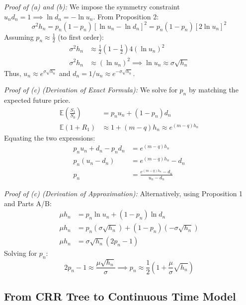 \textit{Proof of (a) and (b):}
We impose the symmetry constraint \(u_n d_n = 1 \implies \ln d_n = - \ln u_n\).
From Proposition 2:
\begin{equation*}
    \sigma^2 h_n = p_n(1-p_n)[\ln u_n - \ln d_n]^2 = p_n(1-p_n)[2 \ln u_n]^2
\end{equation*}
Assuming \(p_n \approx \frac{1}{2}\) (to first order):
\begin{align*}
    \sigma^2 h_n &\approx \frac{1}{2}\left(1-\frac{1}{2}\right) 4 (\ln u_n)^2 \\
    \sigma^2 h_n &\approx (\ln u_n)^2 \implies \ln u_n \approx \sigma\sqrt{h_n}
\end{align*}
Thus, \(u_n \approx e^{\sigma\sqrt{h_n}}\) and \(d_n = 1/u_n \approx e^{-\sigma\sqrt{h_n}}\).

\textit{Proof of (c) (Derivation of Exact Formula):}
We solve for \(p_n\) by matching the expected future price.
\begin{align*}
    \mathbb{E}\left(\frac{S_1}{S_0}\right) &= p_n u_n + (1-p_n)d_n \\
    \mathbb{E}(1+R_1) &\approx 1 + (m-q)h_n \approx e^{(m-q)h_n}
\end{align*}
Equating the two expressions:
\begin{align*}
    p_n u_n + d_n - p_n d_n &= e^{(m-q)h_n} \\
    p_n(u_n - d_n) &= e^{(m-q)h_n} - d_n \\
    p_n &= \frac{e^{(m-q)h_n} - d_n}{u_n - d_n}
\end{align*}

\textit{Proof of (c) (Derivation of Approximation):}
Alternatively, using Proposition 1 and Parts A/B:
\begin{align*}
    \mu h_n &= p_n \ln u_n + (1-p_n) \ln d_n \\
    \mu h_n &= p_n (\sigma\sqrt{h_n}) + (1-p_n)(-\sigma\sqrt{h_n}) \\
    \mu h_n &= \sigma\sqrt{h_n} (2p_n - 1)
\end{align*}
Solving for \(p_n\):
\begin{equation*}
    2p_n - 1 \approx \frac{\mu\sqrt{h_n}}{\sigma} \implies p_n \approx \frac{1}{2}\left(1 + \frac{\mu}{\sigma}\sqrt{h_n}\right)
\end{equation*}

\subsection{From CRR Tree to Continuous Time Model}

